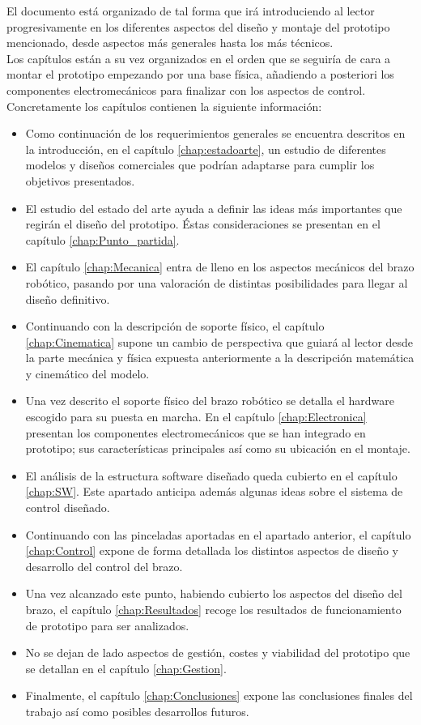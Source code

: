 El documento está organizado de tal forma que irá introduciendo al lector progresivamente en los diferentes aspectos del diseño y montaje del prototipo mencionado, desde aspectos más generales hasta los más técnicos.
\\

Los capítulos están a su vez organizados en el orden que se seguiría de cara a montar el prototipo empezando por una base física, añadiendo a posteriori los componentes electromecánicos para finalizar con los aspectos de control. Concretamente los capítulos contienen la siguiente información:

\begin{itemize}
    \item Como continuación de los requerimientos generales se encuentra descritos en la introducción, en el capítulo \ref{chap:estadoarte}, un estudio de diferentes modelos y diseños comerciales que podrían adaptarse para cumplir los objetivos presentados.
    \item El estudio del estado del arte ayuda a definir las ideas más importantes que regirán el diseño del prototipo. Éstas consideraciones se presentan en el capítulo \ref{chap:Punto_partida}.
    \item El capítulo \ref{chap:Mecanica} entra de lleno en los aspectos mecánicos del brazo robótico, pasando por una valoración de distintas posibilidades para llegar al diseño definitivo.
    \item Continuando con la descripción de soporte físico, el capítulo \ref{chap:Cinematica} supone un cambio de perspectiva que guiará al lector desde la parte mecánica y física expuesta anteriormente a la descripción matemática y cinemático del modelo.
    \item Una vez descrito el soporte físico del brazo robótico se detalla el hardware escogido para su puesta en marcha. En el capítulo \ref{chap:Electronica} presentan los componentes electromecánicos que se han integrado en prototipo; sus características principales así como su ubicación en el montaje.
    \item El análisis de la estructura software diseñado queda cubierto en el capítulo \ref{chap:SW}. Este apartado anticipa además algunas ideas sobre el sistema de control diseñado.
    \item Continuando con las pinceladas aportadas en el apartado anterior, el capítulo \ref{chap:Control} expone de forma detallada los distintos aspectos de diseño y desarrollo del control del brazo.
    \item Una vez alcanzado este punto, habiendo cubierto los aspectos del diseño del brazo, el capítulo \ref{chap:Resultados} recoge los resultados de funcionamiento de prototipo para ser analizados.
    \item No se dejan de lado aspectos de gestión, costes y viabilidad del prototipo que se detallan en el capítulo \ref{chap:Gestion}.
    \item Finalmente, el capítulo \ref{chap:Conclusiones} expone las conclusiones finales del trabajo así como posibles desarrollos futuros.
\end{itemize}

